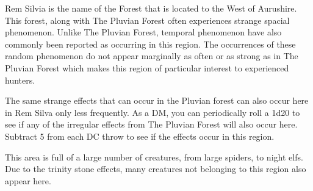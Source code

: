 \documentclass[letterpaper,10pt,twoside,twocolumn,openany]{book}
\begin{document}
Rem Silvia is the name of the Forest that is located to the West of Aurushire. This forest, along with The Pluvian Forest often experiences strange spacial phenomenon. Unlike The Pluvian Forest, temporal phenomenon have also commonly been reported as occurring in this region. The occurrences of these random phenomenon do not appear marginally as often or as strong as in The Pluvian Forest which makes this region of particular interest to experienced hunters.

The same strange effects that can occur in the Pluvian forest can also occur here in Rem Silva only less frequently. As a DM, you can periodically roll a 1d20 to see if any of the irregular effects from The Pluvian Forest will also occur here. Subtract 5 from each DC throw to see if the effects occur in this region.

This area is full of a large number of creatures, from large spiders, to night elfs. Due to the trinity stone effects, many creatures not belonging to this region also appear here. 
\end{document}
